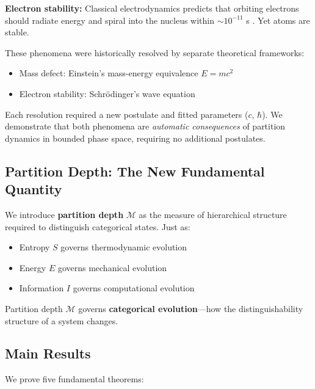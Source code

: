 \documentclass[twocolumn,10pt,a4paper]{article}
\theoremstyle{definition}
\theoremstyle{remark}
\newcommand{\Depth}{\mathcal{M}}
\begin{document}
\textbf{Electron stability:} Classical electrodynamics predicts that orbiting electrons should radiate energy and spiral into the nucleus within $\sim 10^{-11}$ s \cite{larmor1897}. Yet atoms are stable.

These phenomena were historically resolved by separate theoretical frameworks:
\begin{itemize}
    \item Mass defect: Einstein's mass-energy equivalence $E = mc^2$ \cite{einstein1905}
    \item Electron stability: Schr\"{o}dinger's wave equation \cite{schrodinger1926}
\end{itemize}

Each resolution required a new postulate and fitted parameters ($c$, $\hbar$). We demonstrate that both phenomena are \emph{automatic consequences} of partition dynamics in bounded phase space, requiring no additional postulates.

\subsection{Partition Depth: The New Fundamental Quantity}

We introduce \textbf{partition depth} $\Depth$ as the measure of hierarchical structure required to distinguish categorical states. Just as:
\begin{itemize}
    \item Entropy $S$ governs thermodynamic evolution
    \item Energy $E$ governs mechanical evolution
    \item Information $I$ governs computational evolution
\end{itemize}

Partition depth $\Depth$ governs \textbf{categorical evolution}---how the distinguishability structure of a system changes.

\subsection{Main Results}

We prove five fundamental theorems:
\end{document}
